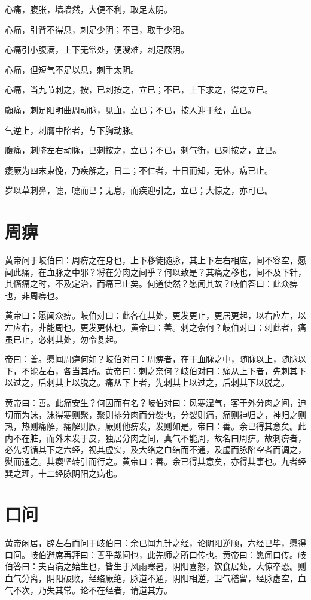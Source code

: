\documentclass[a4paper,12pt,UTF8,twoside]{ctexbook}
\begin{document}
	心痛，腹胀，墙墙然，大便不利，取足太阴。
	
	心痛，引背不得息，刺足少阴；不已，取手少阳。
	
	心痛引小腹满，上下无常处，便溲难，刺足厥阴。
	
	心痛，但短气不足以息，刺手太阴。
	
	心痛，当九节刺之，按，已刺按之，立已；不已，上下求之，得之立已。
	
	顑痛，刺足阳明曲周动脉，见血，立已；不已，按人迎于经，立已。
	
	气逆上，刺膺中陷者，与下胸动脉。
	
	腹痛，刺脐左右动脉，已刺按之，立已；不已，刺气街，已刺按之，立已。
	
	痿厥为四末束悗，乃疾解之，日二；不仁者，十日而知，无休，病已止。
	
	岁以草刺鼻，嚏，嚏而已；无息，而疾迎引之，立已；大惊之，亦可已。
	\chapter{周痹}
	
	黄帝问于岐伯曰：周痹之在身也，上下移徒随脉，其上下左右相应，间不容空，愿闻此痛，在血脉之中邪？将在分肉之间乎？何以致是？其痛之移也，间不及下针，其慉痛之时，不及定治，而痛已止矣。何道使然？愿闻其故？岐伯答曰：此众痹也，非周痹也。
	
	黄帝曰：愿闻众痹。岐伯对曰：此各在其处，更发更止，更居更起，以右应左，以左应右，非能周也。更发更休也。黄帝曰：善。刺之奈何？岐伯对曰：刺此者，痛虽已止，必刺其处，勿令复起。
	
	帝曰：善。愿闻周痹何如？岐伯对曰：周痹者，在于血脉之中，随脉以上，随脉以下，不能左右，各当其所。黄帝曰：刺之奈何？岐伯对曰：痛从上下者，先刺其下以过之，后刺其上以脱之。痛从下上者，先刺其上以过之，后刺其下以脱之。
	
	黄帝曰：善。此痛安生？何因而有名？岐伯对曰：风寒湿气，客于外分肉之间，迫切而为沫，沫得寒则聚，聚则排分肉而分裂也，分裂则痛，痛则神归之，神归之则热，热则痛解，痛解则厥，厥则他痹发，发则如是。帝曰：善。余已得其意矣。此内不在脏，而外未发于皮，独居分肉之间，真气不能周，故名曰周痹。故刺痹者，必先切循其下之六经，视其虚实，及大络之血结而不通，及虚而脉陷空者而调之，熨而通之。其瘈坚转引而行之。黄帝曰：善。余已得其意矣，亦得其事也。九者经巽之理，十二经脉阴阳之病也。
	\chapter{口问}
	
	黄帝闲居，辟左右而问于岐伯曰：余已闻九针之经，论阴阳逆顺，六经已毕，愿得口问。岐伯避席再拜曰：善乎哉问也，此先师之所口传也。黄帝曰：愿闻口传。岐伯答曰：夫百病之始生也，皆生于风雨寒暑，阴阳喜怒，饮食居处，大惊卒恐。则血气分离，阴阳破败，经络厥绝，脉道不通，阴阳相逆，卫气稽留，经脉虚空，血气不次，乃失其常。论不在经者，请道其方。
	
\end{document}
